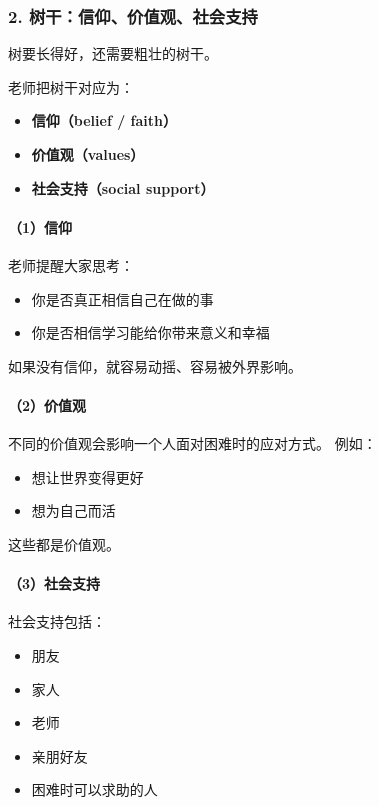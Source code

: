 \documentclass[
  chinese,
  9pt,
  a4paper,
]{ctexart}
\providecommand{\tightlist}{%
  \setlength{\itemsep}{0pt}\setlength{\parskip}{0pt}}
\begin{document}
\subsubsection{2.
树干：信仰、价值观、社会支持}\label{ux6811ux5e72ux4fe1ux4ef0ux4ef7ux503cux89c2ux793eux4f1aux652fux6301}

树要长得好，还需要粗壮的树干。

老师把树干对应为：

\begin{itemize}
\tightlist
\item
  \textbf{信仰（belief / faith）}
\item
  \textbf{价值观（values）}
\item
  \textbf{社会支持（social support）}
\end{itemize}

\paragraph{（1）信仰}\label{ux4fe1ux4ef0}

老师提醒大家思考：

\begin{itemize}
\tightlist
\item
  你是否真正相信自己在做的事
\item
  你是否相信学习能给你带来意义和幸福
\end{itemize}

如果没有信仰，就容易动摇、容易被外界影响。

\paragraph{（2）价值观}\label{ux4ef7ux503cux89c2}

不同的价值观会影响一个人面对困难时的应对方式。 例如：

\begin{itemize}
\tightlist
\item
  想让世界变得更好
\item
  想为自己而活
\end{itemize}

这些都是价值观。

\paragraph{（3）社会支持}\label{ux793eux4f1aux652fux6301}

社会支持包括：

\begin{itemize}
\tightlist
\item
  朋友
\item
  家人
\item
  老师
\item
  亲朋好友
\item
  困难时可以求助的人
\end{itemize}
\end{document}
